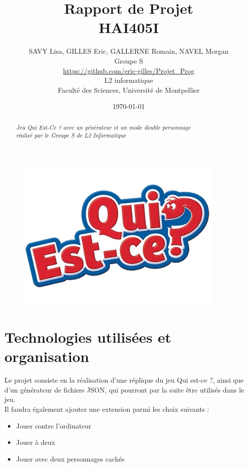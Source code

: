 \documentclass{article}
\title{\textbf{\textsf{\Huge{Rapport de Projet}\\\huge {HAI405I}}}}
\author{SAVY Lisa, GILLES Eric, GALLERNE Romain, NAVEL Morgan\\
{\Large Groupe S}\\
\url{https://github.com/eric-gilles/Projet_Prog}\\
  L2 informatique\\
  Faculté des Sciences, Université de Montpellier}
\date{{\Large \textsf{\today}}}
\begin{document}
    \maketitle
    \vspace{0.5cm}
    \begin{figure}[h]
        \centering
        \includegraphics[width=10cm]{images/Logo-QuiEstce.png}
    \end{figure}
    
    \begin{abstract}
        \centering
        {\textsl{Jeu Qui Est-Ce ? avec un générateur et un mode double personnage \\
        réalisé par le Groupe S de L2 Informatique}}
    \end{abstract}
    
    \pagebreak
    
    \tableofcontents
    
    \pagebreak
    
    \section{Technologies utilisées  et organisation}
        \vspace{0.5cm}
        {\large Le projet consiste en la réalisation d’une réplique du jeu \textsf{Qui est-ce ?}, ainsi que d’un générateur de fichiers JSON, qui pourront par la suite être utilisés dans le jeu.\\
        Il faudra également ajouter une extension parmi les choix suivants :}
        
        \begin{itemize}
            \item Jouer contre l’ordinateur
            \item Jouer à deux
            \item Jouer avec deux personnages cachés
        \end{itemize}
        
\end{document}
